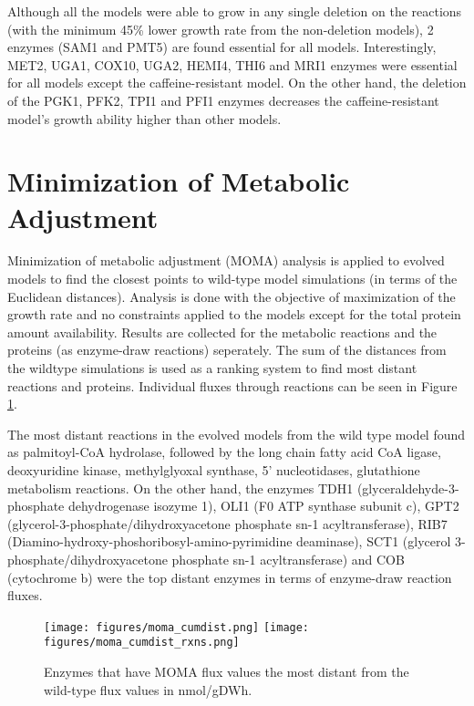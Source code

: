 Although all the models were able to grow in any single deletion on the reactions (with the minimum 45\% lower growth rate from the non-deletion models), 2 enzymes (SAM1 and PMT5) are found essential for all models. Interestingly, MET2, UGA1, COX10, UGA2, HEMI4, THI6 and MRI1 enzymes were essential for all models except the caffeine-resistant model. On the other hand, the deletion of the PGK1, PFK2, TPI1 and PFI1 enzymes decreases the caffeine-resistant model's growth ability higher than other models.

\section{Minimization of Metabolic Adjustment}

Minimization of metabolic adjustment (MOMA) analysis is applied to evolved models to find the closest points to wild-type model simulations (in terms of the Euclidean distances). Analysis is done with the objective of maximization of the growth rate and no constraints applied to the models except for the total protein amount availability. Results are collected for the metabolic reactions and the proteins (as enzyme-draw reactions) seperately. The sum of the distances from the wildtype simulations is used as a ranking system to find most distant reactions and proteins. Individual fluxes through reactions can be seen in Figure \ref{fig:moma_cumdist}.


 The most distant reactions in the evolved models from the wild type model found as palmitoyl-CoA hydrolase, followed by the long chain fatty acid CoA ligase, deoxyuridine kinase, methylglyoxal synthase, 5' nucleotidases, glutathione metabolism reactions. On the other hand, the enzymes TDH1 (glyceraldehyde-3-phosphate dehydrogenase isozyme 1), OLI1 (F0 ATP synthase subunit c), GPT2 (glycerol-3-phosphate/dihydroxyacetone phosphate sn-1 acyltransferase), RIB7 (Diamino-hydroxy-phoshoribosyl-amino-pyrimidine deaminase), SCT1 (glycerol 3-phosphate/dihydroxyacetone phosphate sn-1 acyltransferase) and COB (cytochrome b) were the top distant enzymes in terms of enzyme-draw reaction fluxes.

\begin{figure}[H]
  \begin{center}
  \texttt{[image: figures/moma\_cumdist.png]}
  \texttt{[image: figures/moma\_cumdist\_rxns.png]}
  \caption[Enzymes that have MOMA flux values the most distant from the wild-type flux values in nmol/gDWh]{Enzymes that have MOMA flux values the most distant from the wild-type flux values in nmol/gDWh.}
  \label{fig:moma_cumdist}
  \end{center}
\end{figure}

